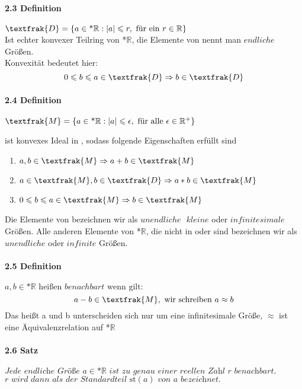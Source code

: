 \documentclass[a4paper]{article}
\begin{document}
\paragraph{2.3 Definition} $ \textfrak{D} = \{a \in \text{*}\mathbb{R}: |a| \leqslant r, \text{ für ein } r \in \mathbb{R}\} $ \\
Ist echter konvexer Teilring von *$\mathbb{R}$, die Elemente von  nennt man $ endliche $ Größen. \\
Konvexität bedeutet hier:
$$ 0 \leqslant b \leqslant a \in \textfrak{D} \Rightarrow b \in \textfrak{D} $$

\paragraph{2.4 Definition} $ \textfrak{M} = \{a \in \text{*}\mathbb{R}: |a| \leqslant \epsilon, \text{ für alle } \epsilon \in \mathbb{R}^+ \} $

\bigskip
{} ist konvexes Ideal in , sodass folgende Eigenschaften erfüllt sind 
\begin{enumerate}
      \item $a,b \in \textfrak{M} \Rightarrow a + b \in \textfrak{M} $ 
      \item $a \in \textfrak{M}, b \in \textfrak{D} \Rightarrow a * b \in \textfrak{M} $ 
      \item $0 \leqslant b \leqslant a \in \textfrak{M} \Rightarrow b \in \textfrak{M} $ 
\end{enumerate}
Die Elemente von  bezeichnen wir als $ unendliche \text{ } kleine $ oder $ infinitesimale $ Größen. 
Alle anderen Elemente von *$\mathbb{R}$, die nicht in  oder  sind bezeichnen wir als $ unendliche $ oder $ infinite $ Größen.

\paragraph{2.5 Definition} $a,b \in \text{*}\mathbb{R} \text{ heißen } benachbart \text{ wenn gilt:} $
$$ a - b \in \textfrak{M}, \text{ wir schreiben } a \approx b$$
Das heißt a und b unterscheiden sich nur um eine infinitesimale Größe, $\approx$ ist eine Äquivalenzrelation auf *$\mathbb{R}$

\paragraph{2.6 Satz} $ \textit{Jede endliche Größe } a \in \text{*}\mathbb{R} \textit{ ist zu genau einer reellen Zahl r benachbart.}$
$ \textit{r wird dann als der Standardteil } \text{st}(a) \textit{ von a bezeichnet.} $
\end{document}
